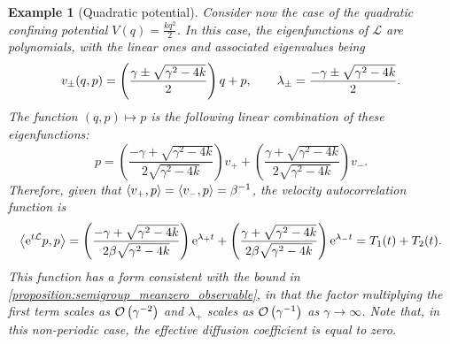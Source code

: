 \documentclass[11pt,a4paper]{article}
\newcommand{\e}{\mathrm{e}}
\renewcommand{\d}{\mathrm d}
\theoremstyle{plain}
\newtheorem{example}{Example}[section]
\numberwithin{equation}{section}
\begin{document}
\begin{example}
    [Quadratic potential]
    \label{example:quadratic}
    Consider now the case of the quadratic confining potential $V(q) = \frac{k q^2}{2}$.
    In this case, the eigenfunctions of $\mathcal L$ are polynomials,
    with the linear ones and associated eigenvalues being
    \[
        v_{\pm}(q, p) =
        \left( \frac{\gamma \pm \sqrt{\gamma^2 - 4k}}{2} \right) q + p, \\
        \qquad
        \lambda_{\pm} = \frac{- \gamma \pm \sqrt{\gamma^2 - 4k}}{2}.
    \]
    The function $(q, p) \mapsto p$ is the following linear combination of these eigenfunctions:
    \[
        p =
        \left( \frac{-\gamma + \sqrt{\gamma^2 - 4k}}{2 \sqrt{\gamma^2 - 4k}} \right) v_+
        + \left( \frac{\gamma + \sqrt{\gamma^2 - 4k}}{2 \sqrt{\gamma^2 - 4k}} \right) v_-.
    \]
    Therefore, given that $\ip{v_+}{p} = \ip{v_-}{p} = \beta^{-1}$,
    the velocity autocorrelation function is
    \[
        \ip{\e^{t \mathcal L}p}{p} =
        \left( \frac{-\gamma + \sqrt{\gamma^2 - 4k}}{2 \beta \sqrt{\gamma^2 - 4k}} \right) \e^{\lambda_+ t} +
        \left( \frac{\gamma + \sqrt{\gamma^2 - 4k}}{2 \beta \sqrt{\gamma^2 - 4k}} \right) \e^{\lambda_- t} = T_1(t) + T_2(t).
    \]
    This function has a form consistent with the bound in \cref{proposition:semigroup_meanzero_observable},
    in that the factor multiplying the first term scales as $\bigo{\gamma^{-2}}$
    and $\lambda_+$ scales as $\bigo {\gamma^{-1}}$ as $\gamma \to \infty$.
    Note that, in this non-periodic case, the effective diffusion coefficient is equal to zero.
\end{example}
\end{document}
